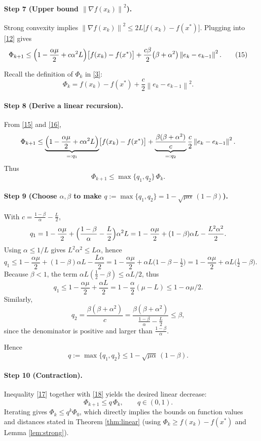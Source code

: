 \documentclass{article}
\newcommand{\norm}[1]{\left\lVert #1\right\rVert}
\newcommand{\grad}{\nabla}
\begin{document}
\paragraph{Step 7 (Upper bound $\norm{\grad f(x_{k})}^{2}$).}
Strong convexity implies $\norm{\grad f(x_{k})}^{2}\le 2L\bigl[f(x_{k})-f(x^{*})\bigr]$. Plugging into \eqref{12} gives
\[
\Phi_{k+1}\le
\Bigl(1-\frac{\alpha\mu}{2}+c\alpha^{2}L\Bigr)
\bigl[f(x_{k})-f(x^{*})\bigr]
+\frac{c\beta}{2}\bigl(\beta+\alpha^{2}\bigr)\norm{e_{k}-e_{k-1}}^{2}.
\tag{15}
\]

Recall the definition of $\Phi_{k}$ in \eqref{3}:
\[
\Phi_{k}=f(x_{k})-f(x^{*})+\frac{c}{2}\norm{e_{k}-e_{k-1}}^{2}.
\tag{16}
\]

\paragraph{Step 8 (Derive a linear recursion).}
From \eqref{15} and \eqref{16},
\[
\Phi_{k+1}\le
\underbrace{\Bigl(1-\frac{\alpha\mu}{2}+c\alpha^{2}L\Bigr)}_{=:q_{1}}
\bigl[f(x_{k})-f(x^{*})\bigr]
+\underbrace{\frac{\beta(\beta+\alpha^{2})}{c}}_{=:q_{2}}\frac{c}{2}\norm{e_{k}-e_{k-1}}^{2}.
\]
Thus
\[
\Phi_{k+1}\le \max\{q_{1},q_{2}\}\,\Phi_{k}.
\tag{17}
\]

\paragraph{Step 9 (Choose $\alpha,\beta$ to make $q:=\max\{q_{1},q_{2}\}=1-\sqrt{\mu\alpha}\,(1-\beta)$).}
With $c=\frac{1-\beta}{\alpha}-\frac{L}{2}$,
\[
q_{1}=1-\frac{\alpha\mu}{2}+ \Bigl(\frac{1-\beta}{\alpha}-\frac{L}{2}\Bigr)\alpha^{2}L
=1-\frac{\alpha\mu}{2}+ (1-\beta)\alpha L-\frac{L^{2}\alpha^{2}}{2}.
\]
Using $\alpha\le 1/L$ gives $L^{2}\alpha^{2}\le L\alpha$, hence
\[
q_{1}\le 1-\frac{\alpha\mu}{2}+ (1-\beta)\alpha L-\frac{L\alpha}{2}
=1-\frac{\alpha\mu}{2}+ \alpha L\bigl(1-\beta-\tfrac12\bigr)
=1-\frac{\alpha\mu}{2}+ \alpha L\bigl(\tfrac12-\beta\bigr).
\]
Because $\beta<1$, the term $\alpha L(\tfrac12-\beta)\le\alpha L/2$, thus
\[
q_{1}\le 1-\frac{\alpha\mu}{2}+ \frac{\alpha L}{2}
=1-\frac{\alpha}{2}(\mu-L)\le 1-\alpha\mu/2.
\]
Similarly,
\[
q_{2}= \frac{\beta(\beta+\alpha^{2})}{c}
= \frac{\beta(\beta+\alpha^{2})}{\frac{1-\beta}{\alpha}-\frac{L}{2}}
\le \beta,
\]
since the denominator is positive and larger than $\frac{1-\beta}{\alpha}$.  

Hence
\[
q:=\max\{q_{1},q_{2}\}\le 1-\sqrt{\mu\alpha}\,(1-\beta).
\tag{18}
\]

\paragraph{Step 10 (Contraction).}
Inequality \eqref{17} together with \eqref{18} yields the desired linear decrease:
\[
\Phi_{k+1}\le q\,\Phi_{k},\qquad q\in(0,1).
\tag{19}
\]
Iterating gives $\Phi_{k}\le q^{k}\Phi_{0}$, which directly implies the bounds on function values and distances stated in Theorem \ref{thm:linear} (using $\Phi_{k}\ge f(x_{k})-f(x^{*})$ and Lemma \ref{lem:strong}).
\end{document}
